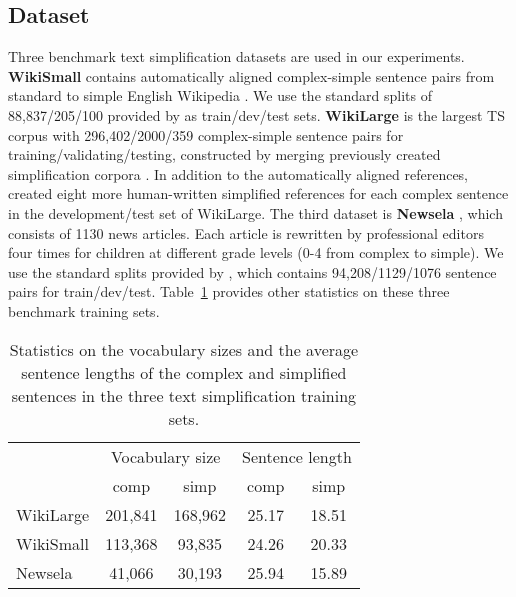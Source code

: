 \documentclass[11pt,a4paper]{article}
\begin{document}
\subsection{Dataset}
\label{sec:dataset}
Three benchmark text simplification datasets are used in our experiments. \textbf{WikiSmall} contains automatically aligned complex-simple sentence pairs from standard to simple English Wikipedia \citep{zhu2010monolingual}. We use the standard splits of 88,837/205/100 provided by \citet{zhang2017sentence} as train/dev/test sets. \textbf{WikiLarge} \citep{zhang2017sentence} is the largest TS corpus with 296,402/2000/359 complex-simple sentence pairs for training/validating/testing, constructed by merging previously created simplification corpora \cite{zhu2010monolingual,woodsend2011learning,kauchak2013improving}. In addition to the automatically aligned references, \citet{xu2016optimizing} created eight more human-written simplified references for each complex sentence in the development/test set of WikiLarge. The third dataset is \textbf{Newsela} \citep{xu2015problems}, which consists of 1130 news articles. Each article is rewritten by professional editors four times for children at different grade levels (0-4 from complex to simple). We use the standard splits provided by \citet{zhang2017sentence}, which contains 94,208/1129/1076 sentence pairs for train/dev/test. Table~\ref{table:dataset_stats} provides other statistics on these three benchmark training sets.
\begin{table}[h]
\small
\centering
\begin{tabular}{l|cc|cc}
\toprule
  & \multicolumn{2}{c|}{Vocabulary size} & \multicolumn{2}{c}{Sentence length} \\
 & comp & simp & comp & simp \\ \midrule
WikiLarge & 201,841 & 168,962 & 25.17 & 18.51 \\
WikiSmall & 113,368 & 93,835 & 24.26 & 20.33 \\
Newsela & 41,066 & 30,193 & 25.94 & 15.89 \\ \bottomrule
\end{tabular}
\caption{Statistics on the vocabulary sizes and the average sentence lengths of the complex and simplified sentences in the three text simplification training sets.}
\label{table:dataset_stats}
\end{table}
\end{document}
